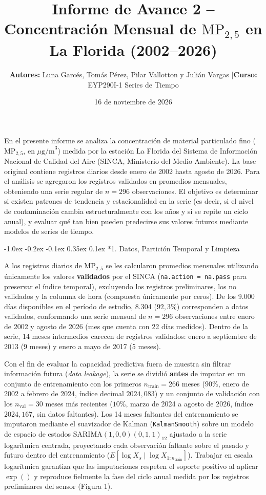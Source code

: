 \documentclass[10pt, a4paper]{article}
\title{\vspace{-1.5cm}\textbf{\large Informe de Avance 2 -- Concentración Mensual de $\text{MP}_{2,5}$ en La Florida (2002--2026)}\vspace{-0.35cm}}
\author{\footnotesize \textbf{Autores:} Luna Garcés, Tomás Pérez, Pilar Vallotton y Julián Vargas \quad|\quad \textbf{Curso:} EYP290I-1 Series de Tiempo\vspace{-0.35cm}}
\date{\scriptsize 16 de noviembre de 2026}
\makeatletter
\renewcommand\section{\@startsection {section}{1}{\z@}%
  {-1.0ex \@plus -0.2ex \@minus -0.1ex}%
  {0.35ex \@plus 0.1ex}%
  {\normalfont\normalsize\bfseries}}
\makeatother
\begin{document}
\maketitle
\thispagestyle{empty}
\pagestyle{empty}
\footnotesize

En el presente informe se analiza la concentración de material particulado fino ($\text{MP}_{2,5}$, en $\mu\text{g/m}^3$) medida por la estación La Florida del Sistema de Información Nacional de Calidad del Aire (SINCA, Ministerio del Medio Ambiente). La base original contiene registros diarios desde enero de 2002 hasta agosto de 2026. Para el análisis se agregaron los registros validados en promedios mensuales, obteniendo una serie regular de $n = 296$ observaciones. El objetivo es determinar si existen patrones de tendencia y estacionalidad en la serie (es decir, si el nivel de contaminación cambia estructuralmente con los años y si se repite un ciclo anual), y evaluar qué tan bien pueden predecirse sus valores futuros mediante modelos de series de tiempo.

\section*{1. Datos, Partición Temporal y Limpieza}

A los registros diarios de $\text{MP}_{2,5}$ se les calcularon promedios mensuales utilizando únicamente los valores \textbf{validados} por el SINCA (\texttt{na.action = na.pass} para preservar el índice temporal), excluyendo los registros preliminares, los no validados y la columna de hora (compuesta únicamente por ceros). De los 9.000 días disponibles en el período de estudio, 8.304 ($92,3$\%) corresponden a datos validados, conformando una serie mensual de $n = 296$ observaciones entre enero de 2002 y agosto de 2026 (mes que cuenta con 22 días medidos). Dentro de la serie, 14 meses intermedios carecen de registros validados: enero a septiembre de 2013 (9 meses) y enero a mayo de 2017 (5 meses).

Con el fin de evaluar la capacidad predictiva fuera de muestra sin filtrar información futura (\textit{data leakage}), la serie se dividió \textbf{antes} de imputar en un conjunto de entrenamiento con los primeros $n_{\text{train}} = 266$ meses ($90$\%, enero de 2002 a febrero de 2024, índice decimal $2024,083$) y un conjunto de validación con los $n_{\text{val}} = 30$ meses más recientes ($10$\%, marzo de 2024 a agosto de 2026, índice $2024,167$, sin datos faltantes). Los 14 meses faltantes del entrenamiento se imputaron mediante el suavizador de Kalman (\texttt{KalmanSmooth}) sobre un modelo de espacio de estados $\text{SARIMA}(1,0,0)(0,1,1)_{12}$ ajustado a la serie logarítmica centrada, proyectando cada observación faltante sobre el pasado y futuro dentro del entrenamiento ($E[\log X_s \mid \log X_{1:n_{\text{train}}}]$). Trabajar en escala logarítmica garantiza que las imputaciones respeten el soporte positivo al aplicar $\exp()$ y reproduce fielmente la fase del ciclo anual medida por los registros preliminares del sensor (Figura 1).
\end{document}
